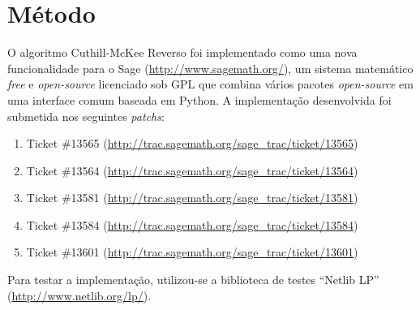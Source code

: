 \section{Método}
O algoritmo Cuthill-McKee Reverso foi implementado como uma nova
funcionalidade para o Sage (\url{http://www.sagemath.org/}), um sistema
matemático \textit{free} e \textit{open-source} licenciado sob
GPL que combina vários pacotes \textit{open-source} em uma interface comum
baseada em Python. A implementação desenvolvida foi submetida nos
seguintes \textit{patchs}:
\begin{enumerate}
    \item Ticket \#13565
        (\url{http://trac.sagemath.org/sage_trac/ticket/13565})
    \item Ticket \#13564
        (\url{http://trac.sagemath.org/sage_trac/ticket/13564})
    \item Ticket \#13581
        (\url{http://trac.sagemath.org/sage_trac/ticket/13581})
    \item Ticket \#13584
        (\url{http://trac.sagemath.org/sage_trac/ticket/13584})
    \item Ticket \#13601
        (\url{http://trac.sagemath.org/sage_trac/ticket/13601})
\end{enumerate}

Para testar a implementação, utilizou-se a biblioteca de testes ``Netlib LP''
(\url{http://www.netlib.org/lp/}).
